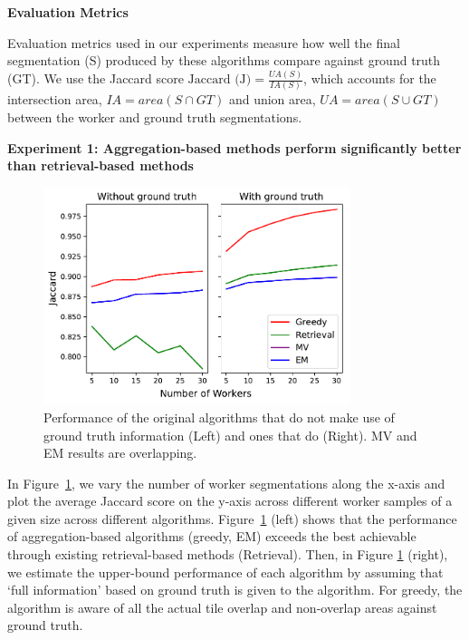 \documentclass[letterpaper]{article}
\newcommand{\agp}[1]{\textcolor{magenta}{Aditya: #1}}
\newcommand{\dor}[1]{\textcolor{blue}{Doris: #1}}
\newcommand{\npar}{\par \noindent}
\newcommand{\stitle}[1]{\noindent \textbf{#1}}
\begin{document}
\stitle{Evaluation Metrics}
\par \noindent Evaluation metrics used in our experiments measure how well the final segmentation (S) produced by these algorithms compare against ground truth (GT). We use the Jaccard score $\text{Jaccard (J)} = \frac{UA(S)}{IA(S)}$, which accounts for the intersection area, $IA=area(S\cap GT)$ and union area, $UA=area(S\cup GT)$ between the worker and ground truth segmentations.

\stitle{Experiment 1: Aggregation-based methods perform significantly better than retrieval-based methods}
\begin{figure}[h!]
   \centering
   \includegraphics[trim={0 1pt 4pt 0},clip,width=0.8\textwidth]{plots/Retrieval_vs_Aggregation.pdf}
   \caption{Performance of the original algorithms that do not make use of ground truth information (Left) and ones that do (Right). MV and EM results are overlapping.} %
   \label{retrieval_vs_aggregation}   
\end{figure} 
\npar In Figure~\ref{retrieval_vs_aggregation}, we vary the number of worker segmentations along the x-axis and plot the average Jaccard score on the y-axis across different worker samples of a given size across different algorithms. Figure~\ref{retrieval_vs_aggregation} (left) shows that the performance of aggregation-based algorithms (greedy, EM) exceeds the best achievable through existing retrieval-based methods (Retrieval). Then, in Figure \ref{retrieval_vs_aggregation} (right), we estimate the upper-bound performance of each algorithm by assuming that `full information' based on ground truth is given to the algorithm. For greedy, the algorithm is aware of all the actual tile overlap and non-overlap areas against ground truth. %
\end{document}
